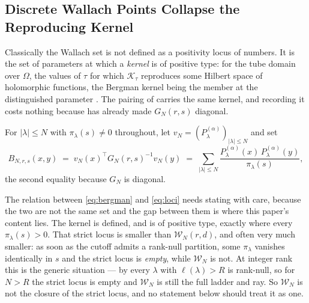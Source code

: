 \documentclass[11pt,letterpaper]{article}
\begin{document}
\subsection{Discrete Wallach Points Collapse the Reproducing Kernel}
\label{ssec:bergman}

Classically the Wallach set is not defined as a positivity locus of numbers. It
is the set of parameters at which a \emph{kernel} is of positive type: for the
tube domain over $\Omega$, the values of $\tau$ for which $\mathcal{K}_\tau$
reproduces some Hilbert space of holomorphic functions, the Bergman kernel being
the member at the distinguished parameter \cite[Ch.~XIII, \S2]{FK}. The pairing of
 carries the same kernel, and recording it costs nothing because
 has already made $G_N(r,s)$ diagonal.

\begin{definition}
\label{def:bergman}
For $|\lambda|\le N$ with $\pi_\lambda(s)\ne0$ throughout, let
$v_N=(P^{(\alpha)}_\lambda)_{|\lambda|\le N}$ and set
\begin{equation}
  B_{N,r,s}(x,y)\;=\;v_N(x)^{\!\top}G_N(r,s)^{-1}v_N(y)
  \;=\;\sum_{|\lambda|\le N}
  \frac{P^{(\alpha)}_\lambda(x)\,P^{(\alpha)}_\lambda(y)}{\pi_\lambda(s)} ,
  \label{eq:bergman}
\end{equation}
the second equality because $G_N$ is diagonal.
\end{definition}

The relation between \eqref{eq:bergman} and \eqref{eq:loci} needs stating with
care, because the two are not the same set and the gap between them is where this
paper's content lies. The kernel is defined, and is of positive type, exactly
where every $\pi_\lambda(s)>0$. That strict locus is smaller than
$\mathcal{W}_N(r,d)$, and often very much smaller: as soon as the cutoff admits a
rank-null partition, some $\pi_\lambda$ vanishes identically in $s$ and the strict
locus is \emph{empty}, while $\mathcal{W}_N$ is not. At integer rank this is the
generic situation --- by  every $\lambda$ with $\ell(\lambda)>R$
is rank-null, so for $N>R$ the strict locus is empty and $\mathcal{W}_N$ is still
the full ladder and ray. So $\mathcal{W}_N$ is not the closure of the strict
locus, and no statement below should treat it as one.
\end{document}
